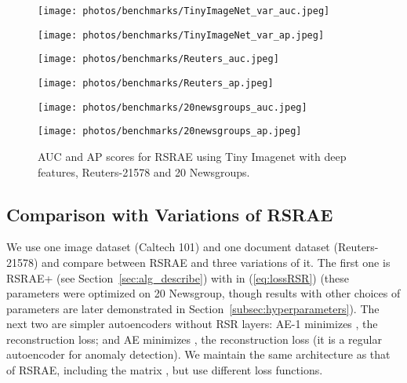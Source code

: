 \documentclass{article} \usepackage{iclr2020_conference,times}
\def\Secref#1{Section~\ref{#1}}
\def\eqref#1{(\ref{#1})}
\begin{document}
\begin{figure}[htb]


\centering
\begin{minipage}[t]{0.48\textwidth}
\centering
\texttt{[image: photos/benchmarks/TinyImageNet\_var\_auc.jpeg]}
\end{minipage}
\begin{minipage}[t]{0.48\textwidth}
\centering
\texttt{[image: photos/benchmarks/TinyImageNet\_var\_ap.jpeg]}
\end{minipage}


 
\centering
\begin{minipage}[t]{0.48\textwidth}
\centering
\texttt{[image: photos/benchmarks/Reuters\_auc.jpeg]}
\end{minipage}
\begin{minipage}[t]{0.48\textwidth}
\centering
\texttt{[image: photos/benchmarks/Reuters\_ap.jpeg]}
\end{minipage}
 
\centering
\begin{minipage}[t]{0.48\textwidth}
\centering
\texttt{[image: photos/benchmarks/20newsgroups\_auc.jpeg]}
\end{minipage}
\begin{minipage}[t]{0.48\textwidth}
\centering
\texttt{[image: photos/benchmarks/20newsgroups\_ap.jpeg]}
\end{minipage}



\caption{AUC and AP scores for RSRAE using Tiny Imagenet with deep features, Reuters-21578 and 20 Newsgroups.}
\label{fig:aucapall2}
\end{figure}



\subsection{Comparison with Variations of RSRAE}
\label{subsec:cprnorm}

We use one image dataset (Caltech 101) and one document dataset (Reuters-21578) and compare between RSRAE and three variations of it. The first one is RSRAE+ (see \Secref{sec:alg_describe}) with  in \eqref{eq:lossRSR} (these parameters were optimized on 20 Newsgroup, though results with other choices of parameters are later demonstrated in \Secref{subsec:hyperparameters}). 
The next two are simpler autoencoders without RSR layers: {AE-1}  minimizes , the  reconstruction loss;
and {AE} minimizes , the  reconstruction loss (it is a regular autoencoder for anomaly detection). We maintain the same architecture as that of RSRAE, including the matrix , but use different loss functions. 
\end{document}

